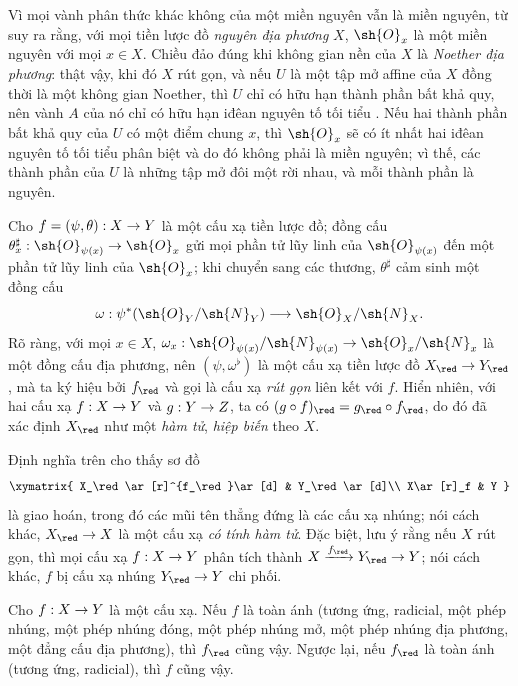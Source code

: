 \documentclass[oneside]{amsart}
\makeatletter
\newcommand{\ega@arrow}[2]{\mathchoice{#1}{#2}{#2}{#2}}
\renewcommand{\to}{\ega@arrow{\longrightarrow}{\rightarrow}}
\newcommand{\oldpage}[2][]{{\marginnote{\normalfont\textbf{#1}~|~#2}}\ignorespaces}
\let\EGAOriginalLabel\label
\renewcommand{\label}[1]{\phantomsection\EGAOriginalLabel{#1}}
\makeatother
\begin{document}
Vì mọi vành phân thức khác không của một miền nguyên vẫn là miền nguyên, từ  suy ra rằng, với mọi tiền lược đồ \emph{nguyên địa phương} $X$, $\sh{O}_x$ là một miền nguyên với mọi $x\in X$.
Chiều đảo đúng khi không gian nền của $X$ là \emph{Noether địa phương}:
thật vậy, khi đó $X$ rút gọn, và nếu $U$ là một tập mở affine của $X$ đồng thời là một không gian Noether, thì $U$ chỉ có hữu hạn thành phần bất khả quy, nên vành $A$ của nó chỉ có hữu hạn iđêan nguyên tố tối tiểu .
Nếu hai thành phần bất khả quy của $U$ có một điểm chung $x$, thì $\sh{O}_x$ sẽ có ít nhất hai iđêan nguyên tố tối tiểu phân biệt và do đó không phải là miền nguyên;
vì thế, các thành phần của $U$ là những tập mở đôi một rời nhau, và mỗi thành phần là nguyên.

\begin{env}[5.1.5]
\label{I.5.1.5}
Cho $f=(\psi,\theta):X\to Y$ là một cấu xạ tiền lược đồ;
\oldpage[I]{129}
đồng cấu $\theta_x^\sharp:\sh{O}_{\psi(x)}\to\sh{O}_x$ gửi mọi phần tử lũy linh của $\sh{O}_{\psi(x)}$ đến một phần tử lũy linh của $\sh{O}_x$;
khi chuyển sang các thương, $\theta^\sharp$ cảm sinh một đồng cấu
\[
  \omega:\psi^*(\sh{O}_Y/\sh{N}_Y)\to\sh{O}_X/\sh{N}_X.
\]
Rõ ràng, với mọi $x\in X$, $\omega_x:\sh{O}_{\psi(x)}/\sh{N}_{\psi(x)}\to\sh{O}_x/\sh{N}_x$ là một đồng cấu địa phương, nên $(\psi,\omega^\flat)$ là một cấu xạ tiền lược đồ $X_\red\to Y_\red$, mà ta ký hiệu bởi $f_\red$ và gọi là cấu xạ \emph{rút gọn} liên kết với $f$.
Hiển nhiên, với hai cấu xạ $f:X\to Y$ và $g:Y\to Z$, ta có $(g\circ f)_\red=g_\red\circ f_\red$, do đó đã xác định $X_\red$ như một \emph{hàm tử}, \emph{hiệp biến} theo $X$.

Định nghĩa trên cho thấy sơ đồ
\[
  \xymatrix{
    X_\red\ar[r]^{f_\red}\ar[d] &
    Y_\red\ar[d]\\
    X\ar[r]_f &
    Y
  }
\]
là giao hoán, trong đó các mũi tên thẳng đứng là các cấu xạ nhúng;
nói cách khác, $X_\red\to X$ là một cấu xạ \emph{có tính hàm tử}.
Đặc biệt, lưu ý rằng nếu $X$ rút gọn, thì mọi cấu xạ $f:X\to Y$ phân tích thành $X\xrightarrow{f_\red}Y_\red\to Y$;
nói cách khác, $f$ bị cấu xạ nhúng $Y_\red\to Y$ chi phối.
\end{env}

\begin{proposition}[5.1.6]
\label{I.5.1.6}
Cho $f:X\to Y$ là một cấu xạ.
Nếu $f$ là toàn ánh (tương ứng, radicial, một phép nhúng, một phép nhúng đóng, một phép nhúng mở, một phép nhúng địa phương, một đẳng cấu địa phương), thì $f_\red$ cũng vậy.
Ngược lại, nếu $f_\red$ là toàn ánh (tương ứng, radicial), thì $f$ cũng vậy.
\end{proposition}
\end{document}
